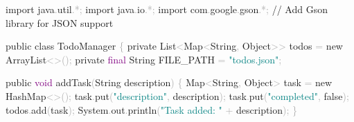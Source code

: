 \documentclass[
  justified,
  openright,
]{tufte-book}
\newcommand{\BuiltInTok}[1]{#1}
\newcommand{\CommentTok}[1]{\textcolor{MidGray}{#1}}
\newcommand{\DataTypeTok}[1]{\textcolor{Purple}{#1}}
\newcommand{\FunctionTok}[1]{\textcolor{BrandBlue}{#1}}
\newcommand{\ImportTok}[1]{\textcolor{BrandAccent}{#1}}
\newcommand{\KeywordTok}[1]{\textcolor{BrandBlue}{#1}}
\newcommand{\NormalTok}[1]{#1}
\newcommand{\OperatorTok}[1]{\textcolor{DarkGray}{#1}}
\newcommand{\StringTok}[1]{\textcolor{Teal}{#1}}
\newenvironment{Shaded}{%
  \begin{snugshade}
}{%
  \end{snugshade}
}
\begin{document}
\begin{Shaded}
\begin{Highlighting}[]
\KeywordTok{import} \ImportTok{java}\OperatorTok{.}\ImportTok{util}\OperatorTok{.*;}
\KeywordTok{import} \ImportTok{java}\OperatorTok{.}\ImportTok{io}\OperatorTok{.*;}
\KeywordTok{import} \ImportTok{com}\OperatorTok{.}\ImportTok{google}\OperatorTok{.}\ImportTok{gson}\OperatorTok{.*;}   \CommentTok{// Add Gson library for JSON support}

\KeywordTok{public} \KeywordTok{class}\NormalTok{ TodoManager }\OperatorTok{\{}
    \KeywordTok{private} \BuiltInTok{List}\OperatorTok{\textless{}}\BuiltInTok{Map}\OperatorTok{\textless{}}\BuiltInTok{String}\OperatorTok{,} \BuiltInTok{Object}\OperatorTok{\textgreater{}\textgreater{}}\NormalTok{ todos }\OperatorTok{=} \KeywordTok{new} \BuiltInTok{ArrayList}\OperatorTok{\textless{}\textgreater{}();}
    \KeywordTok{private} \DataTypeTok{final} \BuiltInTok{String}\NormalTok{ FILE\_PATH }\OperatorTok{=} \StringTok{"todos.json"}\OperatorTok{;}

    \KeywordTok{public} \DataTypeTok{void} \FunctionTok{addTask}\OperatorTok{(}\BuiltInTok{String}\NormalTok{ description}\OperatorTok{)} \OperatorTok{\{}
        \BuiltInTok{Map}\OperatorTok{\textless{}}\BuiltInTok{String}\OperatorTok{,} \BuiltInTok{Object}\OperatorTok{\textgreater{}}\NormalTok{ task }\OperatorTok{=} \KeywordTok{new} \BuiltInTok{HashMap}\OperatorTok{\textless{}\textgreater{}();}
\NormalTok{        task}\OperatorTok{.}\FunctionTok{put}\OperatorTok{(}\StringTok{"description"}\OperatorTok{,}\NormalTok{ description}\OperatorTok{);}
\NormalTok{        task}\OperatorTok{.}\FunctionTok{put}\OperatorTok{(}\StringTok{"completed"}\OperatorTok{,} \KeywordTok{false}\OperatorTok{);}
\NormalTok{        todos}\OperatorTok{.}\FunctionTok{add}\OperatorTok{(}\NormalTok{task}\OperatorTok{);}
        \BuiltInTok{System}\OperatorTok{.}\FunctionTok{out}\OperatorTok{.}\FunctionTok{println}\OperatorTok{(}\StringTok{"Task added: "} \OperatorTok{+}\NormalTok{ description}\OperatorTok{);}
    \OperatorTok{\}}


\end{Highlighting}
\end{Shaded}
\end{document}
